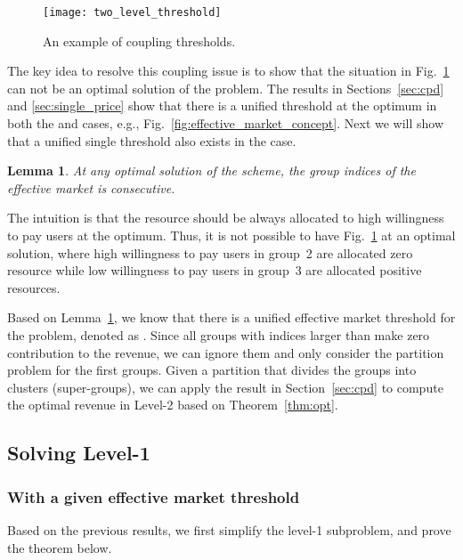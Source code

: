 \documentclass[twocolumn,10pt,twosided]{IEEEtran}
\newtheorem{lemma}{Lemma}
\begin{document}
\begin{figure}[ht]
\centering
\texttt{[image: two\_level\_threshold]}
\caption{An example of coupling thresholds. }
\label{fig:two_level_threshold}
\end{figure}

The key idea to resolve this coupling issue is to show that the situation in Fig.~\ref{fig:two_level_threshold} can not be an optimal solution of the  problem. The results in Sections~\ref{sec:cpd} and \ref{sec:single_price} show that there is a unified threshold at the optimum in both the  and  cases, e.g., Fig.~\ref{fig:effective_market_concept}.  Next we will show that a unified single threshold also exists in the  case.

\begin{lemma}
\label{le:consecutive_index} At any optimal solution of the  scheme, the group indices of the effective market is consecutive.
\end{lemma}


 The intuition is that the resource should be always allocated to high willingness to pay users at the optimum. Thus, it is not possible to have Fig.~\ref{fig:two_level_threshold}  at an optimal solution, where high willingness to pay users in group~2 are allocated zero resource while low willingness to pay users in group~3 are allocated positive resources.


Based on Lemma~\ref{le:consecutive_index}, we know that there is a unified effective market threshold for the  problem, denoted as . Since all groups with indices larger than  make zero contribution to the revenue,  we can ignore them and only consider the partition problem for the first  groups. Given a partition that divides the  groups into  clusters (super-groups), we can apply the  result in Section~\ref{sec:cpd} to compute the optimal revenue in Level-2 based on Theorem~\ref{thm:opt}.


\subsection{Solving Level-1}
\label{sub:L1}
\subsubsection{With a given effective market threshold }
Based on the previous results, we first simplify the level-1 subproblem, and prove the theorem below. 
\end{document}
